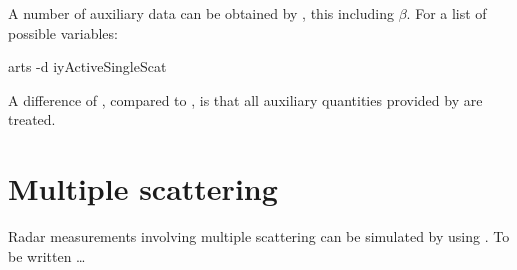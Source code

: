 A number of auxiliary data can be obtained by , this
including $\beta$. For a list of possible variables:
\begin{code}
arts -d iyActiveSingleScat
\end{code}
A difference of , compared to , is
that all auxiliary quantities provided by  are
treated.



\section{Multiple scattering}
\label{sec:cradar:multi}

Radar measurements involving multiple scattering can be simulated by using
. To be written \dots
